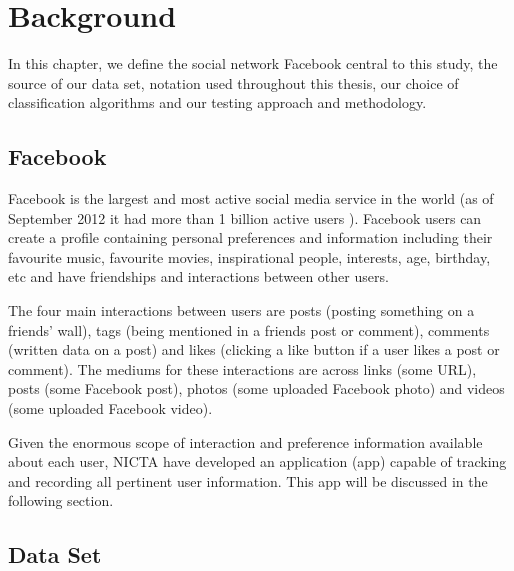 
\chapter{Background}
\label{cha:back}

In this chapter, we define the social network Facebook central to this study, the source of our data set, notation used throughout 
this thesis, our choice of classification algorithms and our testing approach and methodology.

\section{Facebook}
\label{sec:data}

Facebook is the largest and most active social media service in the world (as of September 2012 it had more than 1 billion active users \cite{fbzise}).
Facebook users can create a profile containing personal preferences and information including their favourite music, favourite movies, 
inspirational people, interests, age, birthday, etc and have friendships and interactions between other users. 

The four main interactions between users are posts (posting something on a friends' wall), 
tags (being mentioned in a friends post or comment), comments (written data on a post) and likes (clicking a like button if a user 
likes a post or comment). The mediums for these interactions are across links (some URL), posts (some Facebook post), 
photos (some uploaded Facebook photo) and videos (some uploaded Facebook video).

Given the enormous scope of interaction and preference information available about each user, NICTA have developed an application (app) capable of tracking 
and recording all pertinent user information. This app will be discussed in the following section.


\section{Data Set}
\label{sec:linkr}


